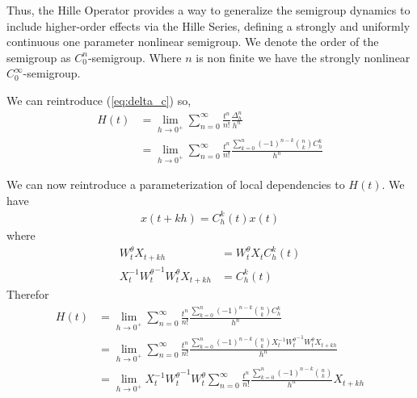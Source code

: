 \documentclass{article}
\begin{document}
Thus, the Hille Operator provides a way to generalize the semigroup dynamics to include higher-order effects via the Hille Series, defining a strongly and uniformly continuous one parameter nonlinear semigroup. We denote the order of the semigroup as $C_0^n$-semigroup. Where $n$ is non finite we have the strongly nonlinear $C_0^\infty$-semigroup. 

We can reintroduce (\ref{eq:delta_c}) so,
\begin{align*}
    H(t)  &= \lim_{h\rightarrow0^+} \sum_{n=0}^\infty \frac{t^n}{n!} \frac{\Delta_h^n}{h^n} \\
    &= \lim_{h\rightarrow0^+} \sum_{n=0}^\infty \frac{t^n}{n!} \frac{ \sum_{k=0}^n (-1)^{n-k} {n \choose k} C_h^k}{h^n} 
\end{align*}

We can now reintroduce a parameterization of local dependencies to $H(t)$. We have
\begin{align*}
    x(t+kh) = C_h^k(t) x(t)
\end{align*}
where
\begin{align*}
    W_t^\theta X_{t+kh} &= W_t^\theta X_{t} C_h^k(t)\\
    X_{t}^{-1}  {W_t^\theta}^{-1} {W_t^\theta} X_{t+kh} &=  C_h^k(t)
\end{align*}
Therefor
\begin{align*}
    H(t)  &= \lim_{h\rightarrow0^+} \sum_{n=0}^\infty \frac{t^n}{n!} \frac{ \sum_{k=0}^n (-1)^{n-k} {n \choose k} C_h^k}{h^n}\\ 
    &= \lim_{h\rightarrow0^+} \sum_{n=0}^\infty \frac{t^n}{n!} \frac{\sum_{k=0}^n (-1)^{n-k} {n \choose k}   X_{t}^{-1}  {W_t^\theta}^{-1} {W_t^\theta} X_{t+kh}}{h^n}\\
    &= \lim_{h\rightarrow0^+} X_{t}^{-1}  {W_t^\theta}^{-1} {W_t^\theta} \sum_{n=0}^\infty \frac{t^n}{n!} \frac{\sum_{k=0}^n (-1)^{n-k} {n \choose k}}{h^n} X_{t+kh}\\
\end{align*}
\end{document}
